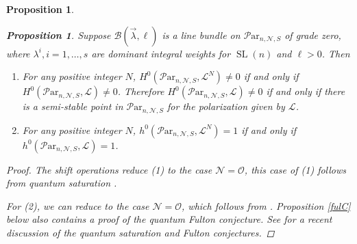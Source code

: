 \documentclass[11pt]{amsart}
\newcommand\op{\operatorname}
\newcommand\ml{\mathcal{L}}
\newcommand\mn{\mathcal{N}}
\newcommand\Par{\mathcal{P}\text{ar} }
\newtheorem{proposition}[theorem]{Proposition}
\numberwithin{theorem}{subsection}
\begin{document}
{\begin{proposition}
\begin{proposition}\label{qTheorems}
Suppose $\mathcal{B}(\vec{\lambda},\ell)$ is a line bundle on  $\Par_{n,\mn,S}$ of grade zero, where $\lambda^i, i=1,\dots, s$ are dominant integral weights for $\op{SL}(n)$ and $\ell>0 $. Then
\begin{enumerate}
\item For any positive integer $N$, $H^0(\Par_{n,\mn,S},\ml^N)\neq 0$ if and only if
$H^0(\Par_{n,\mn,S},\ml)\neq 0$. Therefore $H^0(\Par_{n,\mn,S},\ml)\neq 0$ if and only if
there is a semi-stable point in $\Par_{n,\mn,S}$ for the polarization given by $\ml$.
\item For any positive integer $N$, $h^0(\Par_{n,\mn,S},\ml^N)=1$ if and only if
$h^0(\Par_{n,\mn,S},\ml)=1$.
\end{enumerate}
\end{proposition}
\begin{proof}
The shift operations reduce (1) to the case $\mn=\mathcal{O}$, this case of (1) follows from
quantum saturation \cite[Theorem 1.8]{BHorn}.

For (2), we can reduce to the case $\mn=\mathcal{O}$, which follows from  \cite[Remark 8.5]{BKq}. Proposition \ref{fulC} below also contains a proof of the quantum Fulton conjecture. See \cite{CS} for a recent discussion of the quantum saturation and Fulton conjectures.
\end{proof}


\end{proposition}}
\end{document}
